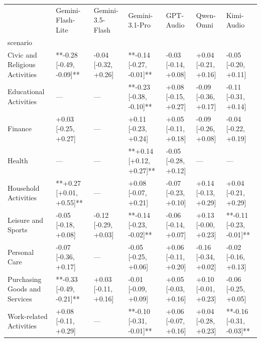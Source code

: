 \begin{tabular}{lllllll}
\toprule
 & Gemini-Flash-Lite & Gemini-3.5-Flash & Gemini-3.1-Pro & GPT-Audio & Qwen-Omni & Kimi-Audio \\
scenario &  &  &  &  &  &  \\
\midrule
Civic and Religious Activities & **-0.28 [-0.49, -0.09]** & -0.04 [-0.32, +0.26] & **-0.14 [-0.27, -0.01]** & -0.03 [-0.14, +0.08] & +0.04 [-0.21, +0.16] & -0.05 [-0.20, +0.11] \\
Educational Activities & — & — & **-0.23 [-0.38, -0.10]** & +0.08 [-0.15, +0.27] & -0.09 [-0.36, +0.17] & -0.11 [-0.31, +0.14] \\
Finance & +0.03 [-0.25, +0.27] & — & +0.11 [-0.23, +0.24] & +0.05 [-0.11, +0.18] & -0.09 [-0.26, +0.08] & -0.04 [-0.22, +0.19] \\
Health & — & — & **+0.14 [+0.12, +0.27]** & -0.05 [-0.28, +0.12] & — & — \\
Household Activities & **+0.27 [+0.01, +0.55]** & — & +0.08 [-0.07, +0.21] & -0.07 [-0.23, +0.10] & +0.14 [-0.13, +0.29] & +0.04 [-0.21, +0.29] \\
Leisure and Sports & -0.05 [-0.18, +0.08] & -0.12 [-0.29, +0.03] & **-0.14 [-0.23, -0.02]** & -0.06 [-0.14, +0.07] & +0.13 [-0.00, +0.23] & **-0.11 [-0.23, -0.01]** \\
Personal Care & -0.07 [-0.36, +0.17] & — & -0.05 [-0.25, +0.06] & +0.06 [-0.11, +0.20] & -0.16 [-0.34, +0.02] & -0.02 [-0.16, +0.13] \\
Purchasing Goods and Services & **-0.33 [-0.49, -0.21]** & +0.03 [-0.11, +0.16] & -0.01 [-0.09, +0.09] & +0.05 [-0.03, +0.16] & +0.10 [-0.01, +0.23] & -0.06 [-0.25, +0.05] \\
Work-related Activities & +0.08 [-0.11, +0.29] & — & **-0.10 [-0.31, -0.01]** & +0.06 [-0.07, +0.16] & +0.04 [-0.28, +0.23] & **-0.16 [-0.31, -0.03]** \\
\bottomrule
\end{tabular}
